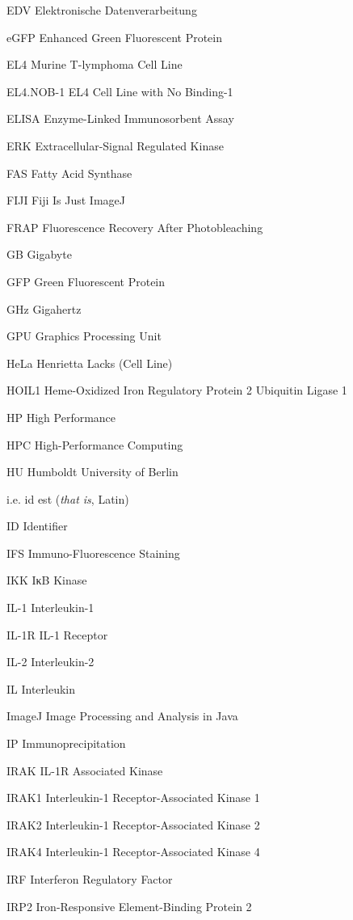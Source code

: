 \begin{spacing}{0.75}
\begin{abbreviations}
\item[EDV] Elektronische Datenverarbeitung
\item[eGFP] Enhanced Green Fluorescent Protein
\item[EL4] Murine T-lymphoma Cell Line
\item[EL4.NOB-1] EL4 Cell Line with No Binding-1
\item[ELISA] Enzyme-Linked Immunosorbent Assay
\item[ERK] Extracellular-Signal Regulated Kinase
\item[FAS] Fatty Acid Synthase
\item[FIJI] Fiji Is Just ImageJ
\item[FRAP] Fluorescence Recovery After Photobleaching
\item[GB] Gigabyte
\item[GFP] Green Fluorescent Protein
\item[GHz] Gigahertz
\item[GPU] Graphics Processing Unit
\item[HeLa] Henrietta Lacks (Cell Line)
\item[HOIL1] Heme-Oxidized Iron Regulatory Protein 2 Ubiquitin Ligase 1
\item[HP] High Performance
\item[HPC] High-Performance Computing
\item[HU] Humboldt University of Berlin
\item[i.e.] id est (\emph{that is}, Latin)
\item[ID] Identifier
\item[IFS] Immuno-Fluorescence Staining
\item[IKK] IκB Kinase
\item[IL-1] Interleukin-1
\item[IL-1R] IL-1 Receptor
\item[IL-2] Interleukin-2
\item[IL] Interleukin
\item[ImageJ] Image Processing and Analysis in Java
\item[IP] Immunoprecipitation
\item[IRAK] IL-1R Associated Kinase
\item[IRAK1] Interleukin-1 Receptor-Associated Kinase 1
\item[IRAK2] Interleukin-1 Receptor-Associated Kinase 2
\item[IRAK4] Interleukin-1 Receptor-Associated Kinase 4
\item[IRF] Interferon Regulatory Factor
\item[IRP2] Iron-Responsive Element-Binding Protein 2

\end{abbreviations}
\end{spacing}
